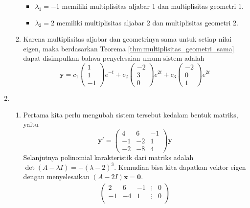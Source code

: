 \documentclass[a4paper]{article}
\theoremstyle{definisi}
\numberwithin{equation}{section}
\begin{document}
\begin{enumerate}
\begin{enumerate}
      \begin{itemize}
        \item $\lambda_1=-1$ memiliki multiplisitas aljabar 1 dan multiplisitas geometri 1.
        \item $\lambda_2=2$ memiliki multiplisitas aljabar 2 dan multiplisitas geometri 2.
      \end{itemize}
      \item Karena multiplisitas aljabar dan geometrinya sama untuk setiap nilai eigen, maka berdasarkan Teorema \ref{thm:multiplisitas_geometri_sama} dapat disimpulkan bahwa penyelesaian umum sistem adalah
      \begin{equation*}
        \mathbf{y}=c_1\begin{pmatrix}
          1\\1\\-1
        \end{pmatrix}e^{-t}+c_2\begin{pmatrix}
          -2\\3\\0
        \end{pmatrix}e^{2t}+c_3\begin{pmatrix}
          -2\\0\\1
        \end{pmatrix}e^{2t}
      \end{equation*}
    \end{enumerate}
    \item \begin{enumerate}
      \item Pertama kita perlu mengubah sistem tersebut kedalam bentuk matriks, yaitu
      \begin{equation*}
        \mathbf{y'}=\begin{pmatrix}
          4&6&-1\\
          -1&-2&1\\
          -2&-8&4
        \end{pmatrix}\mathbf{y}
      \end{equation*}
      Selanjutnya polinomial karakteristik dari matriks adalah $\det(A-\lambda I)=-(\lambda-2)^3$. Kemudian bisa kita dapatkan vektor eigen dengan menyelesaikan $(A-2I)\mathbf{x}=\mathbf{0}$.
      \begin{align*}
        \begin{pmatrix}
          2&6&-1&\vdots&0\\
          -1&-4&1&\vdots&0\\

\end{pmatrix}
\end{align*}
\end{enumerate}
\end{enumerate}
\end{document}
